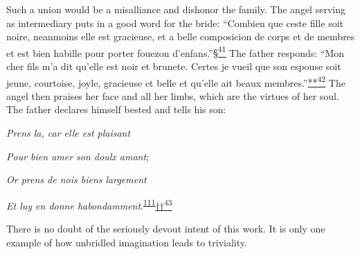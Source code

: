Such a union would be a misalliance and dishonor the family. The angel
serving as intermediary puts in a good word for the bride: ``Combien que
ceste fille soit noire, neanmoins elle est gracieuse, et a belle
composicion de corps et de membres et est bien habille pour porter
fouezon
d'enfans.''\protect\hypertarget{13_Chapter_Six__THE_DEPICTION_OF_TH.xhtmlux5cux23id_3171}{\protect\hyperlink{23_NOTES.xhtmlux5cux23id_3172}{§\textsuperscript{41}}}
The father responds: ``Mon cher fils m'a dit qu'elle est noir et
brunete. Certes je vueil que son espouse soit jeune, courtoise, joyle,
gracieuse et belle et qu'elle ait beaux
membres.''\protect\hypertarget{13_Chapter_Six__THE_DEPICTION_OF_TH.xhtmlux5cux23id_3173}{\protect\hyperlink{23_NOTES.xhtmlux5cux23id_3174}{**\textsuperscript{42}}}
The angel then praises her face and all her limbs, which are the virtues
of her soul. The father declares himself bested and tells his son:

\emph{Prens la, car elle est plaisant}

\emph{Pour bien amer son doulx amant};

\emph{Or prens de nois biens largement}

\emph{Et luy en donne
habondamment}.\textsuperscript{\protect\hypertarget{13_Chapter_Six__THE_DEPICTION_OF_TH.xhtmlux5cux23id_1051}{\protect\hyperlink{23_NOTES.xhtmlux5cux23id_1052}{111}}}\protect\hypertarget{13_Chapter_Six__THE_DEPICTION_OF_TH.xhtmlux5cux23id_3175}{\protect\hyperlink{23_NOTES.xhtmlux5cux23id_3176}{††\textsuperscript{43}}}

There is no doubt of the seriously devout intent of this work. It is
only one example of how unbridled imagination leads to triviality.

